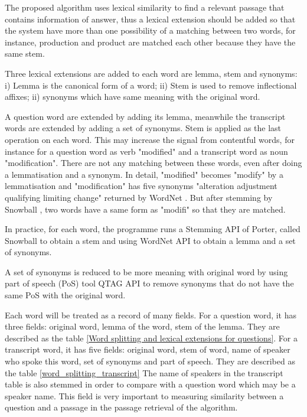 \documentclass[10pt,a4paper]{article}
\numberwithin{algorithm}{section}  %
\begin{document}
The proposed algorithm uses lexical similarity to find a relevant passage that contains information of answer, thus a lexical extension should be added so that the system have more than one possibility of a matching between two words, for instance, production and product are matched each other because they have the same stem. 

Three lexical extensions are added to each word are lemma, stem and synonyms: i) Lemma is the canonical form of a word; ii) Stem is used to remove inflectional affixes; ii) synonyms which have same meaning with the original word. 


A question word are extended by adding its lemma, meanwhile the transcript words are extended by adding a set of synonyms. Stem is applied as the last operation on each word. This may increase the signal from contentful words, for instance for a question word as verb "modified" and a transcript word as noun "modification". There are not any matching between these words, even after doing a lemmatisation and a synonym.  In detail, "modified" becomes "modify" by a lemmatisation and "modification" has five synonyms "alteration adjustment qualifying limiting change" returned by WordNet \cite{pasca2001irw}. But after stemming by Snowball \cite{porter2001ss}, two words have a same form as "modifi" so that they are matched.

In practice, for each word, the programme runs a Stemming API of Porter, called Snowball \cite{porter2001ss} to obtain a stem and using WordNet API \cite{pasca2001irw} to obtain a lemma and a set of synonyms.

A set of synonyms is reduced to be more meaning with original word by using part of speech (PoS) tool QTAG API \cite{manson1997qpp} to remove synonyms that do not have the same PoS with the original word.  

Each word will be treated as a record of many fields. For a question word, it has three fields: original word, lemma of the word, stem of the lemma. They are described as the table \ref{Word splitting and lexical extensions for questions}. For a transcript word, it has five fields: original word, stem of word, name of speaker who spoke this word, set of synonyms and part of speech. They are described as the table \ref{word_splitting_transcript} The name of speakers in the transcript table is also stemmed in order to compare with a question word which may be a speaker name. This field is very important to measuring similarity between a question and a passage in the passage retrieval of the algorithm.
\end{document}
